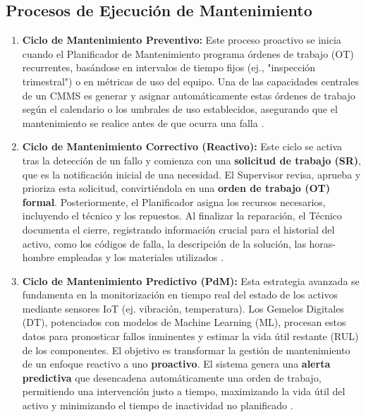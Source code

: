\subsection{Procesos de Ejecución de Mantenimiento}

\begin{enumerate}
    \item \textbf{Ciclo de Mantenimiento Preventivo:} Este proceso proactivo se inicia cuando el Planificador de Mantenimiento programa órdenes de trabajo (OT) recurrentes, basándose en intervalos de tiempo fijos (ej., "inspección trimestral") o en métricas de uso del equipo. Una de las capacidades centrales de un CMMS es generar y asignar automáticamente estas órdenes de trabajo según el calendario o los umbrales de uso establecidos, asegurando que el mantenimiento se realice antes de que ocurra una falla \parencite{accruent:2025, collabit:2020, fmx:2019, honeywell:2018, laurila:2017, mazenko:2015}.
    \item \textbf{Ciclo de Mantenimiento Correctivo (Reactivo):} Este ciclo se activa tras la detección de un fallo y comienza con una \textbf{solicitud de trabajo (SR)}, que es la notificación inicial de una necesidad. El Supervisor revisa, aprueba y prioriza esta solicitud, convirtiéndola en una \textbf{orden de trabajo (OT) formal}. Posteriormente, el Planificador asigna los recursos necesarios, incluyendo el técnico y los repuestos. Al finalizar la reparación, el Técnico documenta el cierre, registrando información crucial para el historial del activo, como los códigos de falla, la descripción de la solución, las horas-hombre empleadas y los materiales utilizados \parencite{accruent:2025, fracttal:2024, landau:2023, stum:2018, tractian:2025b}.
    \item \textbf{Ciclo de Mantenimiento Predictivo (PdM):} Esta estrategia avanzada se fundamenta en la monitorización en tiempo real del estado de los activos mediante sensores IoT (ej. vibración, temperatura). Los Gemelos Digitales (DT), potenciados con modelos de Machine Learning (ML), procesan estos datos para pronosticar fallos inminentes y estimar la vida útil restante (RUL) de los componentes. El objetivo es transformar la gestión de mantenimiento de un enfoque reactivo a uno \textbf{proactivo}. El sistema genera una \textbf{alerta predictiva} que desencadena automáticamente una orden de trabajo, permitiendo una intervención justo a tiempo, maximizando la vida útil del activo y minimizando el tiempo de inactividad no planificado \parencite{chen:2025, ibm:2024, osullivan:2020, tractian:2025a}.
\end{enumerate}

